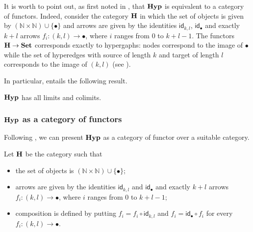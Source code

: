 \documentclass[a4paper,UKenglish,cleveref,pdftex,thm-restate,numberwithinsect]{lipics-v2021}
\newcommand{\Set}{\mathbf{Set}}
\newcommand{\catname}[1]{\textbf{\textup{#1}}}
\newcommand{\hyp}{\catname{Hyp}}
\newcommand{\id}[1]{\mathsf{id}_{#1}}
\begin{document}
\begin{remark}\label{rem:functor}
	It is worth to point out, as first noted in \cite{bonchi2022string}, that $\hyp$ is equivalent to a category of functors. 
	Indeed, consider the category $\catname{H}$ in which the set of objects is given by $ (\mathbb{N}\times \mathbb{N}) \cup \{\bullet\}$ and arrows are given by the identities $\id{k,l}$, $\id{\bullet}$ and exactly $k+l$ arrows $f_i\colon (k,l)\rightarrow \bullet$, where $i$ ranges from $0$ to $k+l-1$. 
	The functors $\catname{H}\to \Set$ corresponds exactly to hypergaphs: nodes correspond to the image of $\bullet$ while the set of hyperedges with source of length $k$ and target of length $l$ corresponds to the image of $(k,l)$ (see \cite{CastelnovoGM24}).
\end{remark}

In particular,  entails the following result. 

\begin{proposition}\label{prop:cocomp}
	$\hyp$ has all limits and colimits.
\end{proposition}

\iffalse
\subsubsection{$\hyp$ as a category of functors}

Following \cite{bonchi2022string}, we can present $\hyp$ as a category of functor over a suitable category.

\begin{definition}Let $\catname{H}$ be the category such that
	\begin{itemize}
		\item the set of objects is $ (\mathbb{N}\times \mathbb{N}) \cup \{\bullet\}$;
		\item arrows are given by the identities $\id{k,l}$ and $\id{\bullet}$ and exactly $k+l$ arrows $f_i\colon (k,l)\rightarrow \bullet$, where $i$ ranges from $0$ to $k+l-1$;
		\item composition is defined by putting
			$f_i=f_i\circ \id{k,l}$ and $f_i = \id{\bullet}\circ f_i$
		for every $f_i\colon (k,l)\rightarrow \bullet$.
	\end{itemize}
\end{definition}
\end{document}
